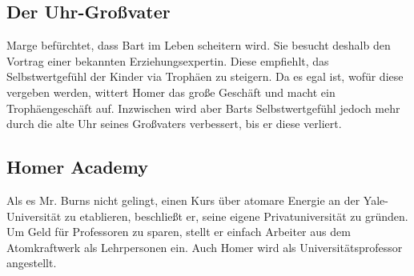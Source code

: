 
\subsection{Der Uhr-Großvater}\label{WABF11}
Marge befürchtet, dass Bart im Leben scheitern wird. Sie besucht deshalb den Vortrag einer bekannten Erziehungsexpertin. Diese empfiehlt, das Selbstwertgefühl der Kinder via Trophäen zu steigern. Da es egal ist, wofür diese vergeben werden, wittert Homer das große Geschäft und macht ein Trophäengeschäft auf. Inzwischen wird aber Barts Selbstwertgefühl jedoch mehr durch die alte Uhr seines Großvaters verbessert, bis er diese verliert.


\subsection{Homer Academy}
Als es Mr. Burns nicht gelingt, einen Kurs über atomare Energie an der Yale-Universität zu etablieren, beschließt er, seine eigene Privatuniversität zu gründen. Um Geld für Professoren zu sparen, stellt er einfach Arbeiter aus dem Atomkraftwerk als Lehrpersonen ein. Auch Homer wird als Universitätsprofessor angestellt.


